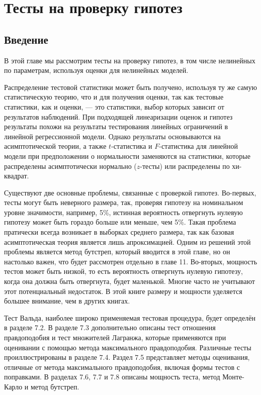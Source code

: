 
\chapter{Тесты на проверку гипотез}
\section{Введение}

В этой главе мы рассмотрим тесты на проверку гипотез, в том числе нелинейных по параметрам, используя оценки для нелинейных моделей.

Распределение тестовой статистики может быть получено, используя ту же самую статистическую теорию, что и для получения оценки, так как тестовые статистики, как и оценки, --- это статистики, выбор которых зависит от результатов наблюдений. При подходящей линеаризации оценок и гипотез результаты похожи на результаты тестирования линейных ограничений в линейной регрессионной модели. Однако результаты основываются на асимптотической теории, а также $t$-статистика и $F$-статистика для линейной модели при предположении о нормальности заменяются на статистики, которые распределены асимптотически нормально ($z$-тесты) или распределены по хи-квадрат.

Существуют две основные проблемы, связанные с проверкой гипотез. Во-первых, тесты могут быть неверного размера, так, проверяя гипотезу на номинальном уровне значимости, например, 5\%, истинная вероятность отвергнуть нулевую гипотезу может быть гораздо больше или меньше, чем 5\%. Такая проблема пратически всегда возникает в выборках среднего размера, так как базовая асимптотическая теория является лишь апроксимацией. Одним из решений этой проблемы является метод бутстреп, который вводится в этой главе, но он настолько важен, что будет рассмотрен отдельно в главе 11. Во-вторых, мощность тестов может быть низкой, то есть вероятность отвергнуть нулевую гипотезу, когда она должна быть отвергнута, будет маленькой. Многие часто не учитывают этот потенциальный недостаток. В этой книге размеру и мощности уделяется большее внимание, чем в других книгах.

Тест Вальда, наиболее широко применяемая тестовая процедура, будет определён в разделе 7.2. В разделе 7.3 дополнительно описаны тест отношения правдоподобия и тест множителей Лагранжа, которые применяются при оценивании с помощью метода максимального правдоподобия. Различные тесты проиллюстрированы в разделе 7.4. Раздел 7.5 представляет методы оценивания, отличные от метода максимального правдоподобия, включая формы тестов с поправками. В разделах 7.6, 7.7 и 7.8 описаны мощность теста, метод Монте-Карло и метод бутстреп.

